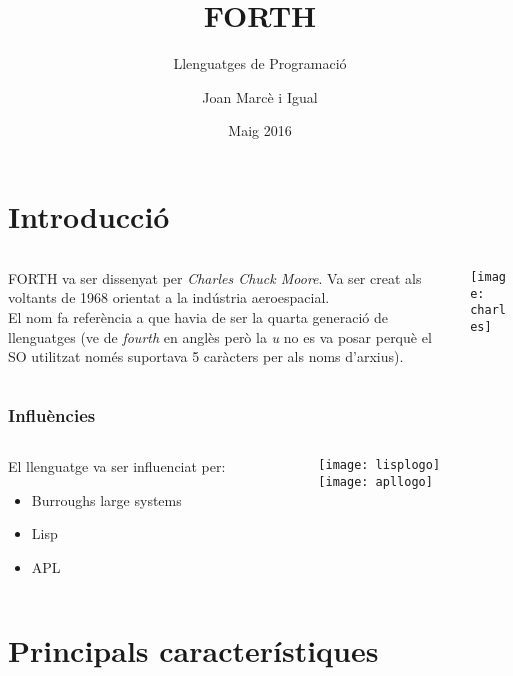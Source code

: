 \documentclass{beamer}
\title{FORTH}
\subtitle{Llenguatges de Programació}
\author{Joan Marcè i Igual}
\institute[UPC]{Universitat Politècnica de Catalunya}
\date{Maig 2016}
\begin{document}
\frame{\titlepage}

\section{Introducció}

\begin{frame}
    \begin{columns}[c]
        \begin{column}{0.5\linewidth}
            FORTH va ser dissenyat per \emph{Charles Chuck Moore}. Va ser creat als voltants de 1968 orientat a la indústria aeroespacial. \\
            \pause
            El nom fa referència a que havia de ser la quarta generació de llenguatges
            (ve de \emph{fourth} en anglès però la \emph{u} no es va posar perquè el SO utilitzat només suportava 5 caràcters per als noms d'arxius).
        \end{column}
        \begin{column}{0.5\linewidth}
            \onslide\texttt{[image: charles]}    
        \end{column}

    \end{columns}
\end{frame}

\begin{frame}
    \frametitle{Influències}
    \begin{columns}[c]
        \begin{column}{0.7\linewidth}
            El llenguatge va ser influenciat per:
            \begin{itemize}
                \item Burroughs large systems
                \item Lisp
                \item APL
            \end{itemize}
        \end{column}
        \begin{column}{0.3\linewidth}
            \centering
            \texttt{[image: lisplogo]}\\
            \texttt{[image: apllogo]}
        \end{column}
    \end{columns}
\end{frame}

\section{Principals característiques}
\end{document}
